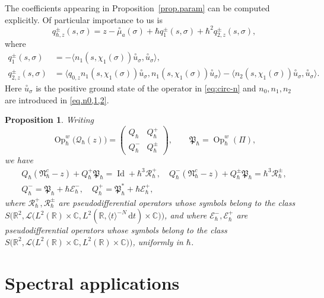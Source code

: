 \documentclass[10pt]{amsart}
\newcommand{\rd}{\,\mathrm{d}}
\DeclareMathOperator{\Id}{Id}
\DeclareMathOperator{\Op}{Op}
\theoremstyle{plain}
\newtheorem{proposition}[theorem]{Proposition}
\theoremstyle{definition}
\newcommand{\R}{\mathbb{R}}
\newcommand{\C}{\mathbb{C}}
\begin{document}
The coefficients appearing in Proposition~\ref{prop.param} can be computed explicitly. Of particular importance to us is
\begin{equation}\label{eq:param1}
q^\pm_{\hbar,z}(s,\sigma)=z- \overset{\circ}{\mu}_a(\sigma)+\hbar q_{1}^\pm(s,\sigma)+\hbar^2 q^\pm_{2,z}(s,\sigma),
\end{equation}
where
\begin{align}
q_1^\pm(s,\sigma)&=-\langle n_1(s,\chi_1(\sigma))\overset{\circ}{u}_{\sigma},\overset{\circ}{u}_{\sigma}\rangle, \label{eq:param20}\\
q_{2,z}^\pm(s,\sigma)&=\langle q_{0,z}n_1(s,\chi_1(\sigma))\overset{\circ}{u}_{\sigma},n_1(s,\chi_1(\sigma))\overset{\circ}{u}_{\sigma}\rangle-\langle n_2(s,\chi_1(\sigma))\overset{\circ}{u}_{\sigma},\overset{\circ}{u}_{\sigma}\rangle.\label{eq:param2}
\end{align}
Here $\overset{\circ}{u}_\sigma$ is the positive ground state of the operator in \eqref{eq:circ-n} and $n_0,n_1,n_2$ are introduced in \eqref{eq.n0,1,2}.

\begin{proposition}\label{cor.1}
Writing
\[
\Op^w_\hbar\bigl(\mathscr{Q}_\hbar(z)\bigr)=\begin{pmatrix}
Q_\hbar&Q^+_\hbar\\
Q^-_\hbar&Q^\pm_\hbar
\end{pmatrix},\qquad \mathfrak{P}_\hbar= \Op^w_\hbar(\Pi),
\]
we have
\begin{gather}\label{eq:cor.1-1}
Q_{\hbar}(\mathfrak{N}_{\hbar}^c-z)+Q^+_\hbar\mathfrak{P}_\hbar=\Id+{\hbar^3\mathscr R_{\hbar}^+},\quad Q^-_\hbar(\mathfrak{N}_{\hbar}^c-z)+Q^\pm_\hbar\mathfrak{P}_\hbar=\hbar^3\mathscr R_{\hbar}^\pm,
\\
\label{eq:cor.1-2}Q^-_\hbar=\mathfrak{P}_\hbar+{ \hbar\mathscr E_\hbar^-},\quad Q^+_\hbar=\mathfrak{P}^*_\hbar+\hbar\mathscr E_\hbar^+,
\end{gather}
where $ \mathscr R_{\hbar}^+,\mathscr R_{\hbar}^\pm$ are pseudodifferential operators whose symbols belong to the class $S\bigl(\R^2,\mathscr{L}\bigl(L^2(\R)\times\C, L^2(\R, \langle t\rangle^{-N}\rd t)\times\C\bigr)\bigr)$, and where $\mathscr E_{\hbar}^-,\mathscr E_{\hbar}^+$ are pseudodifferential operators whose symbols belong to the class $S\bigl(\R^2,\mathscr{L}\bigl(L^2(\R)\times\C, L^2(\R)\times\C\bigr)\bigr)$, uniformly in $\hbar$.
\end{proposition}

\section{Spectral applications}
\end{document}
